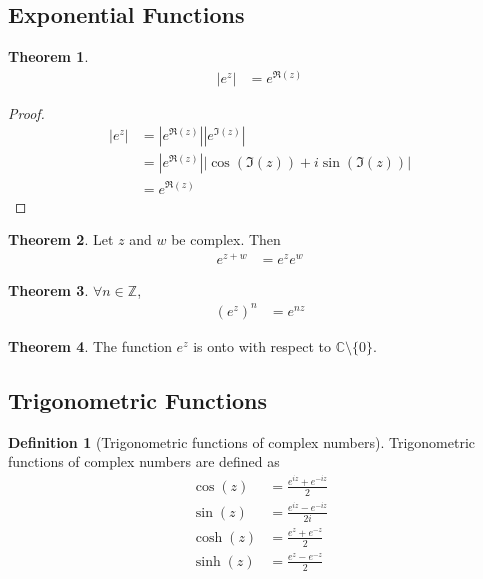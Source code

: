 \documentclass[titlepage, fleqn, a4paper, 12pt, twoside]{article}
\theoremstyle{definition}
\newtheorem{definition}{Definition}
\theoremstyle{theorem}
\newtheorem{theorem}{Theorem}
\begin{document}
\subsection{Exponential Functions}

\begin{theorem}
	\begin{align*}
		\left| e^z \right| & = e^{\Re(z)}
	\end{align*}
\end{theorem}

\begin{proof}
	\begin{align*}
		\left| e^{z} \right| & = \left| e^{\Re(z)} \right| \left| e^{\Im(z)} \right|                                              \\
                                     & = \left| e^{\Re(z)} \right| \left| \cos\left( \Im(z) \right) + i \sin\left( \Im(z) \right) \right| \\
                                     & = e^{\Re(z)}
	\end{align*}
\end{proof}

\begin{theorem}
	Let $z$ and $w$ be complex.
	Then
	\begin{align*}
		e^{z + w} &= e^z e^w
	\end{align*}
\end{theorem}

\begin{theorem}
	$\forall n \in \mathbb{Z}$,
	\begin{align*}
		\left( e^z \right)^n &= e^{n z}
	\end{align*}
\end{theorem}

\begin{theorem}
	The function $e^z$ is onto with respect to $\mathbb{C} \setminus \{0\}$.
\end{theorem}

\subsection{Trigonometric Functions}

\begin{definition}[Trigonometric functions of complex numbers]
	Trigonometric functions of complex numbers are defined as
	\begin{align*}
		\cos(z)  & = \frac{e^{i z} + e^{-i z}}{2}   \\
		\sin(z)  & = \frac{e^{i z} - e^{-i z}}{2 i} \\
		\cosh(z) & = \frac{e^z + e^{-z}}{2}         \\
		\sinh(z) & = \frac{e^z - e^{-z}}{2}
	\end{align*}
\end{definition}
\end{document}
